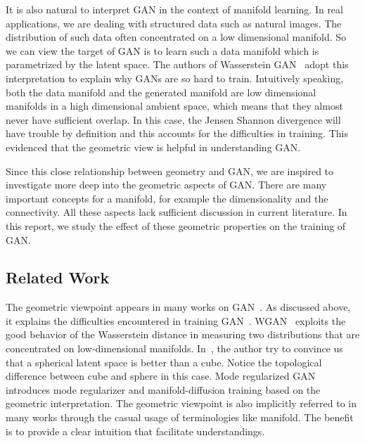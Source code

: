 It is also natural to interpret GAN
in the context of manifold learning.
In real applications,
we are dealing with structured data
such as natural images.
The distribution of such data often concentrated on a low dimensional manifold.
So we can view the target of GAN is to learn such a data manifold
which is parametrized by the latent space.
The authors of Wasserstein GAN~\cite{arjovsky2017towards,arjovsky2017wasserstein}
adopt this interpretation to explain why GANs are so hard to train.
Intuitively speaking,
both the data manifold and the generated manifold are
low dimensional manifolds in a high dimensional ambient space,
which means that they almost never have sufficient overlap.
In this case,
the Jensen Shannon divergence will have trouble by definition
and this accounts for the difficulties in training.
This evidenced that the geometric view is helpful in understanding GAN.

Since this close relationship between geometry and GAN,
we are inspired to investigate more deep into the geometric aspects of GAN.
There are many important concepts for a manifold,
for example the dimensionality and the connectivity.
All these aspects lack sufficient discussion in current literature.
In this report,
we study the effect of these geometric properties on the training of GAN.

\subsection{Related Work}

The geometric viewpoint appears in many works on
GAN~\cite{arjovsky2017towards,zhao2016energy,
arjovsky2017wasserstein,che2016mode,zhu2017unpaired,zhu2016generative}.
As discussed above,
it explains the difficulties encountered in
training GAN~\cite{arjovsky2017towards}.
WGAN~\cite{arjovsky2017wasserstein} exploits the good behavior of the
Wasserstein distance in measuring two distributions that are concentrated on
low-dimensional manifolds.
In~\cite{white2016sampling},
the author try to convince us that a spherical latent space is
better than a cube.
Notice  the topological difference between
cube and sphere in this case.
Mode regularized GAN~\cite{che2016mode} introduces mode regularizer and
manifold-diffusion training based on the geometric interpretation.
The geometric viewpoint is also implicitly referred to in many works
through the casual usage of terminologies like manifold.
The benefit is to provide a clear intuition that facilitate understandings.
